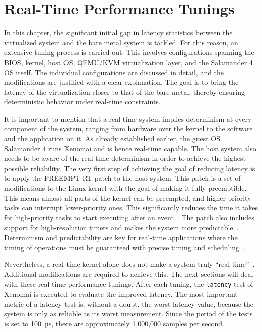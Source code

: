 \documentclass[MMR,Master,english]{style/twbook}
\begin{document}
\clearpage

\section{Real-Time Performance Tunings}\label{sec:real-time_tunings}

In this chapter, the significant initial gap in latency statistics between the virtualized system and the bare metal system is tackled. For this reason, an extensive tuning process is carried out. This involves configurations spanning the BIOS, kernel, host OS, QEMU/KVM virtualization layer, and the Salamander 4 OS itself. The individual configurations are discussed in detail, and the modifications are justified with a clear explanation. The goal is to bring the latency of the virtualization closer to that of the bare metal, thereby ensuring deterministic behavior under real-time constraints.

\bigskip \noindent It is important to mention that a real-time system implies determinism at every component of the system, ranging from hardware over the kernel to the software and the application on it. As already established earlier, the guest OS Salamander 4 runs Xenomai and is hence real-time capable. The host system also needs to be aware of the real-time determinism in order to achieve the highest possible reliability. The very first step of achieving the goal of reducing latency is to apply the PREEMPT-RT patch to the host system. This patch is a set of modifications to the Linux kernel with the goal of making it fully preemptible. This means almost all parts of the kernel can be preempted, and higher-priority tasks can interrupt lower-priority ones. This significantly reduces the time it takes for high-priority tasks to start executing after an event~\cite{RealtimeKernelPatchset}. The patch also includes support for high-resolution timers and makes the system more predictable~\cite{lutsykPipelinedMulticoreMachine2020}. Determinism and predictability are key for real-time applications where the timing of operations must be guaranteed with precise timing and scheduling~\cite{rostedtInternalsRTPatch2007}.

\bigskip \noindent Nevertheless, a real-time kernel alone does not make a system truly “real-time”~\cite{WhatRealtimeLinuxa}. Additional modifications are required to achieve this. The next sections will deal with these real-time performance tunings. After each tuning, the \texttt{latency} test of Xenomai is executed to evaluate the improved latency. The most important metric of a latency test is, without a doubt, the worst latency value, because the system is only as reliable as its worst measurement. Since the period of the tests is set to 100~µs, there are approximately 1,000,000 samples per second.
\end{document}
